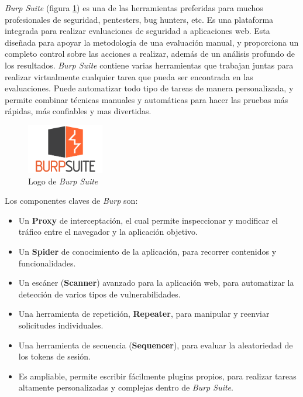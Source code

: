 \textit{Burp Suite}\cite{burp} (figura \ref{fig:burp-logo}) es una de las herramientas preferidas para muchos profesionales de seguridad, pentesters, bug hunters, etc.  Es una plataforma integrada para realizar evaluaciones de seguridad a aplicaciones web. Esta diseñada para apoyar la metodología de una evaluación manual, y proporciona un completo control sobre las acciones a realizar, además de un análisis profundo de los resultados. \textit{Burp Suite} contiene varias herramientas que trabajan juntas para realizar virtualmente cualquier tarea que pueda ser encontrada en las evaluaciones. Puede automatizar todo tipo de tareas de manera personalizada, y permite combinar técnicas manuales y automáticas para hacer las pruebas más rápidas, más confiables y mas divertidas.

\begin{figure}[h]
    \centering
    \includegraphics[width=0.30\textwidth]{images/sections/tools/burp.png}
    \caption{Logo de \textit{Burp Suite}}
    \label{fig:burp-logo}
\end{figure}

Los componentes claves de \textit{Burp} son:
\begin{itemize}
    \item Un \textbf{Proxy} de interceptación, el cual permite inspeccionar y modificar el tráfico entre el navegador y la aplicación objetivo.
    \item Un \textbf{Spider} de conocimiento de la aplicación, para recorrer contenidos y funcionalidades.
    \item Un escáner (\textbf{Scanner}) avanzado para la aplicación web, para automatizar la detección de varios tipos de vulnerabilidades.
    \item Una herramienta de repetición, \textbf{Repeater}, para manipular y reenviar solicitudes individuales.
    \item Una herramienta de secuencia (\textbf{Sequencer}), para evaluar la aleatoriedad de los tokens de sesión.
    \item Es ampliable, permite escribir fácilmente plugins propios, para realizar tareas altamente personalizadas y complejas dentro de \textit{Burp Suite}.
\end{itemize}

